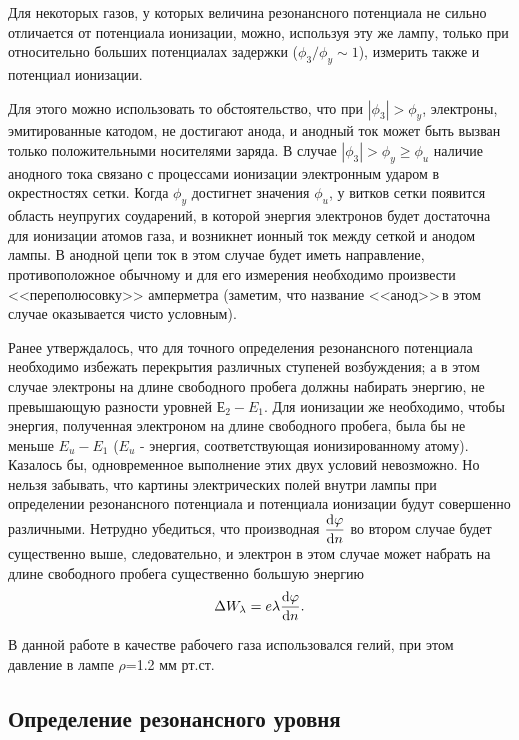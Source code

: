 Для некоторых газов, у которых величина резонансного потенциала не сильно отличается от потенциала ионизации, можно, используя эту же лампу, только при относительно больших потенциалах задержки 
($\phi_{3} /\phi_{y} \sim1$), измерить также и потенциал ионизации.

Для этого можно использовать то обстоятельство, что при 
$|\phi_{3}|>{\phi_{y}}$, электроны, эмитированные катодом, не достигают анода, и анодный ток может быть вызван только положительными носителями заряда. В случае $|\phi_{3}|>{\phi_{y}}\geqslant{\phi_{u}}$ наличие анодного тока связано с процессами ионизации электронным ударом в окрестностях сетки. Когда $\phi_{y}$ достигнет значения $\phi_{u}$, у витков сетки появится область неупругих соударений, в которой энергия электронов будет достаточна для ионизации атомов газа, и возникнет ионный ток между сеткой и анодом лампы. В анодной цепи ток в этом случае будет иметь направление, противоположное обычному и для его измерения необходимо произвести <<переполюсовку>> амперметра (заметим, что название <<анод>>\,в этом случае оказывается чисто условным).

Ранее утверждалось, что для точного определения резонансного потенциала необходимо избежать перекрытия различных ступеней возбуждения; а в этом случае электроны на длине свободного пробега должны набирать энергию, не превышающую разности уровней $\text{Е}_{2}-E_{1}$. Для ионизации же необходимо, чтобы энергия, полученная электроном на длине свободного пробега, была бы не меньше $E_{u}-E_1$ ($E_{u}$ - энергия, соответствующая ионизированному атому). Казалось бы, одновременное выполнение этих двух условий невозможно. Но нельзя забывать, что картины электрических полей внутри лампы при определении резонансного потенциала и потенциала ионизации будут совершенно различными. Нетрудно убедиться, что производная $\displaystyle\dv{\varphi}{n}$ во втором случае будет существенно выше, следовательно, и электрон в этом случае может набрать на длине свободного пробега существенно большую энергию $$\Delta W_{\lambda}=e\lambda \displaystyle\dv{\varphi}{n}.$$

В данной работе в качестве рабочего газа использовался гелий, при этом давление в лампе $\rho$=1.2 мм рт.ст.
\subsection{Определение резонансного уровня}




